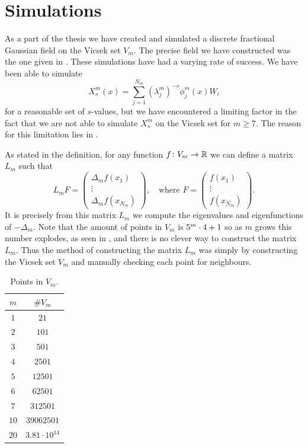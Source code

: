 \setlength\beforechapskip{-1em}
\chapter{Simulations}\label{chap:simulations}
As a part of the thesis we have created and simulated a discrete fractional Gaussian field on the Vicsek set $V_m$. The precise field we have constructed was the one given in . 
These simulations have had a varying rate of success. We have been able to simulate
\begin{equation}
	X_s^{m}(x) = \sum_{j = 1}^{N_m} \left(\lambda_j^{m}\right)^{-s} \phi_j^{m}(x) W_i
\end{equation} for a reasonable set of $s$-values, but we have encountered a limiting factor in the fact that we are not able to simulate $X_s^{m}$ on the Vicsek set for $m \geq 7$. The reason for this limitation lies in . 

As stated in the definition, for any function $f\colon V_m \to \mathbb{R}$ we can define a matrix $L_m$ such that
\begin{equation}
	L_mF = \begin{pmatrix}
		\Delta_m f(x_1)\\
		\vdots \\
		\Delta_{m}f(x_{N_m})
	\end{pmatrix}, \quad \text{where } F = \begin{pmatrix}
		f(x_1)\\
		\vdots \\
		f(x_{N_m})
	\end{pmatrix}.
\end{equation}
It is precisely from this matrix $L_m$ we compute the eigenvalues and eigenfunctions of $-\Delta_m$. Note that the amount of points in $V_m$ is $5^{m}\cdot 4 +1$ so as $m$ grows this number explodes, as seen in , and there is no clever way to construct the matrix $L_m$. Thus the method of constructing the matrix $L_m$ was simply by constructing the Vicsek set $V_m$ and manually checking each point for neighbours.
\begin{table}[!ht]
	\centering
	\begin{tabular}{|c|c|}
		\hline
		$m$  & $\# V_m$ \\ \hline
		$1$  & $21$\\ \hline
		$2$  & $101$\\ \hline
		$3$  & $501$\\ \hline
		$4$  & $2501$\\ \hline
		$5$  & $12501$\\ \hline
		$6$  & $62501$ \\ \hline
		$7$  & $312501$\\ \hline
		$10$ & $39 062 501$\\ \hline
		$20$ & $3.81\cdot10^{14}$\\ \hline                 
	\end{tabular}
	\caption{Points in $V_m$.}
	\label{TableOfValues}
\end{table}

